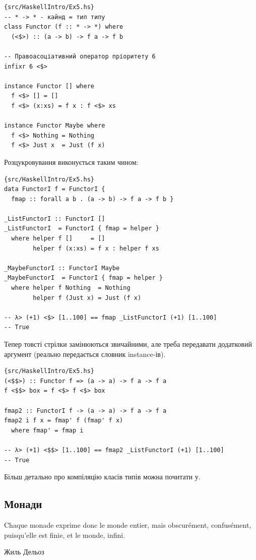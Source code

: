 \documentclass[12pt]{article}
\begin{document}
\begin{lstlisting}{src/HaskellIntro/Ex5.hs}
-- * -> * - кайнд = тип типу
class Functor (f :: * -> *) where
  (<$>) :: (a -> b) -> f a -> f b

-- Правоасоціативний оператор пріоритету 6
infixr 6 <$>

instance Functor [] where
  f <$> [] = []
  f <$> (x:xs) = f x : f <$> xs

instance Functor Maybe where
  f <$> Nothing = Nothing
  f <$> Just x  = Just (f x)
\end{lstlisting}

Розцукровування виконується таким чином:

\begin{lstlisting}{src/HaskellIntro/Ex5.hs}
data FunctorI f = FunctorI {
  fmap :: forall a b . (a -> b) -> f a -> f b }

_ListFunctorI :: FunctorI []
_ListFunctorI  = FunctorI { fmap = helper }
  where helper f []     = []
        helper f (x:xs) = f x : helper f xs

_MaybeFunctorI :: FunctorI Maybe
_MaybeFunctorI  = FunctorI { fmap = helper }
  where helper f Nothing  = Nothing
        helper f (Just x) = Just (f x)

-- λ> (+1) <$> [1..100] == fmap _ListFunctorI (+1) [1..100]
-- True
\end{lstlisting}

Тепер товсті стрілки замінюються звичайними, але треба 
передавати додатковий аргумент (реально передається 
словник instance-ів).

\begin{lstlisting}{src/HaskellIntro/Ex5.hs}
(<$$>) :: Functor f => (a -> a) -> f a -> f a
f <$$> box = f <$> f <$> box

fmap2 :: FunctorI f -> (a -> a) -> f a -> f a
fmap2 i f x = fmap' f (fmap' f x)
  where fmap' = fmap i

-- λ> (+1) <$$> [1..100] == fmap2 _ListFunctorI (+1) [1..100]
-- True
\end{lstlisting}

Більш детально про компіляцію класів типів можна
почитати у\cite{scrapClasses}.

\subsection{Монади}

\epigraph{Chaque monade exprime donc le monde entier, mais obscurément, confusément, puisqu’elle est finie, et le monde, infini.}{Жиль Дельоз}
\end{document}
